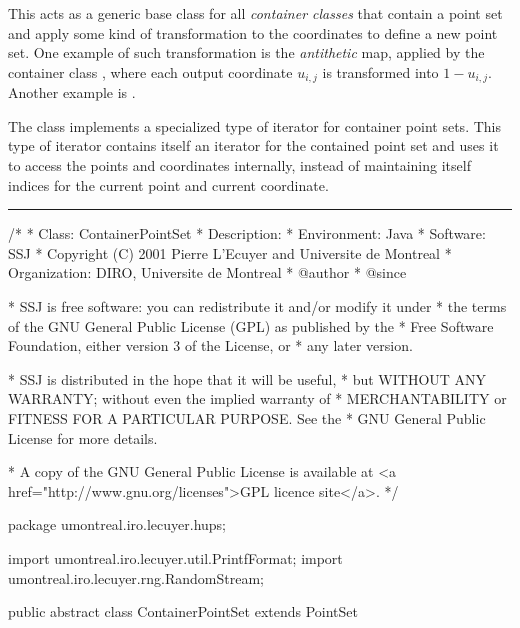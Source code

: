 
This acts as a generic base class for all \emph{container
classes} that contain a point set and apply some kind of
transformation to the coordinates to define a new point set.
One example of such transformation is the \emph{antithetic} map,
applied by the container class ,
where each output coordinate $u_{i,j}$ is transformed into $1-u_{i,j}$.
Another example is .

The class implements a specialized type of iterator for container
point sets.  This type of iterator contains itself an iterator for
the contained point set and uses it to access the points and coordinates
internally, instead of maintaining itself indices for the current point
and current coordinate.


\bigskip\hrule\bigskip

\begin{code}
\begin{hide}
/*
 * Class:        ContainerPointSet
 * Description:
 * Environment:  Java
 * Software:     SSJ
 * Copyright (C) 2001  Pierre L'Ecuyer and Universite de Montreal
 * Organization: DIRO, Universite de Montreal
 * @author
 * @since

 * SSJ is free software: you can redistribute it and/or modify it under
 * the terms of the GNU General Public License (GPL) as published by the
 * Free Software Foundation, either version 3 of the License, or
 * any later version.

 * SSJ is distributed in the hope that it will be useful,
 * but WITHOUT ANY WARRANTY; without even the implied warranty of
 * MERCHANTABILITY or FITNESS FOR A PARTICULAR PURPOSE.  See the
 * GNU General Public License for more details.

 * A copy of the GNU General Public License is available at
   <a href="http://www.gnu.org/licenses">GPL licence site</a>.
 */
\end{hide}
package umontreal.iro.lecuyer.hups;\begin{hide}

import umontreal.iro.lecuyer.util.PrintfFormat;
import umontreal.iro.lecuyer.rng.RandomStream;
\end{hide}

public abstract class ContainerPointSet extends PointSet \begin{hide} {
   protected PointSet P;                 // contained point set
\end{hide}
\end{code}

